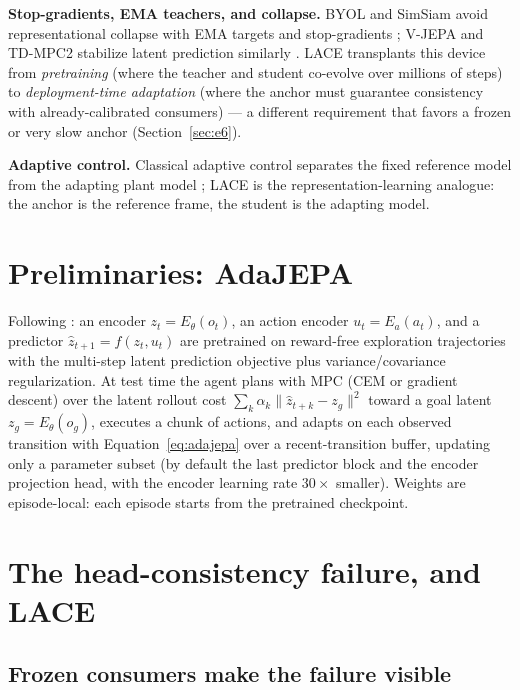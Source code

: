 \documentclass{article}
\newcommand{\lace}{\textsc{LACE}}
\newcommand{\Estud}{E_{\theta}}
\begin{document}
\textbf{Stop-gradients, EMA teachers, and collapse.} BYOL and SimSiam avoid
representational collapse with EMA targets and stop-gradients
\citep{grill2020byol,chen2021simsiam}; V-JEPA and TD-MPC2 stabilize latent
prediction similarly \citep{bardes2024vjepa,hansen2024tdmpc2}. \lace{}
transplants this device from \emph{pretraining} (where the teacher and student
co-evolve over millions of steps) to \emph{deployment-time adaptation} (where
the anchor must guarantee consistency with already-calibrated consumers) ---
a different requirement that favors a frozen or very slow anchor
(Section~\ref{sec:e6}).

\textbf{Adaptive control.} Classical adaptive control separates the fixed
reference model from the adapting plant model \citep{astrom2008adaptive};
\lace{} is the representation-learning analogue: the anchor is the reference
frame, the student is the adapting model.

\section{Preliminaries: AdaJEPA}
\label{sec:prelim}

Following \citet{anonymous2026adajepa}: an encoder $z_t = \Estud(o_t)$, an
action encoder $u_t = E_a(a_t)$, and a predictor
$\hat z_{t+1} = f(z_t, u_t)$ are pretrained on reward-free exploration
trajectories with the multi-step latent prediction objective plus
variance/covariance regularization. At test time the agent plans with MPC
(CEM or gradient descent) over the latent rollout cost
$\sum_k \alpha_k \lVert \hat z_{t+k} - z_g \rVert^2$ toward a goal latent
$z_g = \Estud(o_g)$, executes a chunk of actions, and adapts on each observed
transition with Equation~\eqref{eq:adajepa} over a recent-transition buffer,
updating only a parameter subset (by default the last predictor block and the
encoder projection head, with the encoder learning rate $30\times$ smaller).
Weights are episode-local: each episode starts from the pretrained
checkpoint.

\section{The head-consistency failure, and \lace{}}
\label{sec:method}

\subsection{Frozen consumers make the failure visible}
\label{sec:probes}
\end{document}
